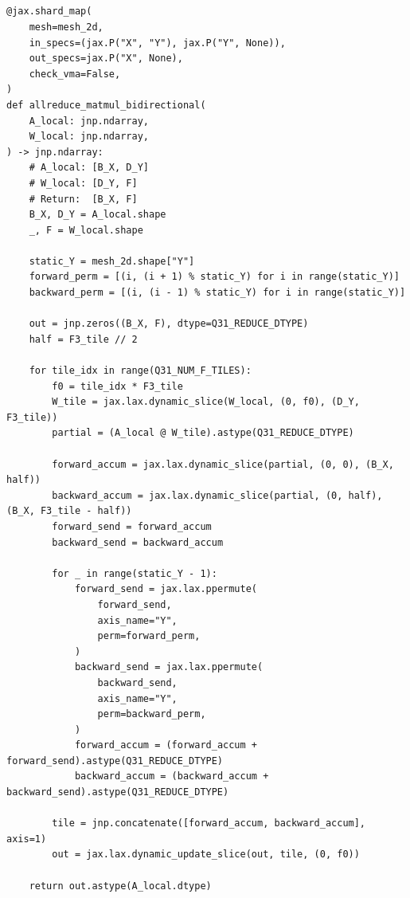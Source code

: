 \documentclass[11pt]{article}
\begin{document}
\subsection{}
\begin{lstlisting}[style=pythoncode]
  @jax.shard_map(
    mesh=mesh_2d,
    in_specs=(jax.P("X", "Y"), jax.P("Y", None)),
    out_specs=jax.P("X", None),
    check_vma=False,
)
def allreduce_matmul_bidirectional(
    A_local: jnp.ndarray,
    W_local: jnp.ndarray,
) -> jnp.ndarray:
    # A_local: [B_X, D_Y]
    # W_local: [D_Y, F]
    # Return:  [B_X, F]
    B_X, D_Y = A_local.shape
    _, F = W_local.shape

    static_Y = mesh_2d.shape["Y"]
    forward_perm = [(i, (i + 1) % static_Y) for i in range(static_Y)]
    backward_perm = [(i, (i - 1) % static_Y) for i in range(static_Y)]

    out = jnp.zeros((B_X, F), dtype=Q31_REDUCE_DTYPE)
    half = F3_tile // 2

    for tile_idx in range(Q31_NUM_F_TILES):
        f0 = tile_idx * F3_tile
        W_tile = jax.lax.dynamic_slice(W_local, (0, f0), (D_Y, F3_tile))
        partial = (A_local @ W_tile).astype(Q31_REDUCE_DTYPE)

        forward_accum = jax.lax.dynamic_slice(partial, (0, 0), (B_X, half))
        backward_accum = jax.lax.dynamic_slice(partial, (0, half), (B_X, F3_tile - half))
        forward_send = forward_accum
        backward_send = backward_accum

        for _ in range(static_Y - 1):
            forward_send = jax.lax.ppermute(
                forward_send,
                axis_name="Y",
                perm=forward_perm,
            )
            backward_send = jax.lax.ppermute(
                backward_send,
                axis_name="Y",
                perm=backward_perm,
            )
            forward_accum = (forward_accum + forward_send).astype(Q31_REDUCE_DTYPE)
            backward_accum = (backward_accum + backward_send).astype(Q31_REDUCE_DTYPE)

        tile = jnp.concatenate([forward_accum, backward_accum], axis=1)
        out = jax.lax.dynamic_update_slice(out, tile, (0, f0))

    return out.astype(A_local.dtype)
  
\end{lstlisting}
\end{document}
